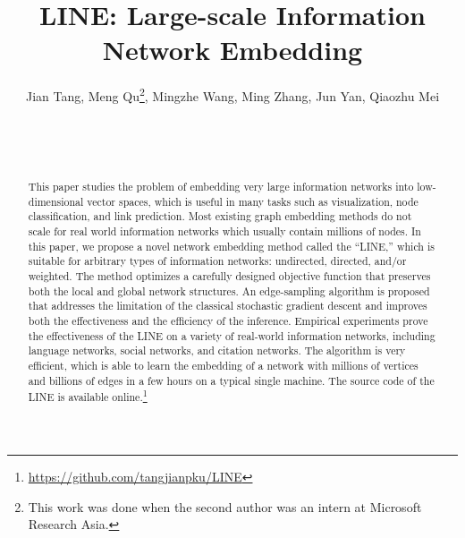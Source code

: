 \documentclass{sig-alternate-2013}
\begin{document}
\title{LINE: Large-scale Information Network Embedding}




\author{
Jian Tang, Meng Qu\thanks{This work was done when the second author was an intern at Microsoft Research Asia.}, Mingzhe Wang, Ming Zhang, Jun Yan, Qiaozhu Mei \\
\\
\\
\\
}


\maketitle
\begin{abstract}












This paper studies the problem of embedding very large information networks into low-dimensional vector spaces, which is useful in many tasks such as visualization, node classification, and link prediction. Most existing graph embedding methods do not scale for real world information networks which usually contain millions of nodes. In this paper, we propose a novel network embedding method called the ``LINE,'' which is suitable for arbitrary types of information networks: undirected, directed, and/or weighted. The method optimizes a carefully designed objective function that preserves both the local and global network structures. An edge-sampling algorithm is proposed that addresses the limitation of the classical stochastic gradient descent and improves both the effectiveness and the efficiency of the inference. Empirical experiments prove the effectiveness of the LINE on a variety of real-world information networks, including language networks, social networks, and citation networks. The algorithm is very efficient, which is able to learn the embedding of a network with millions of vertices and billions of edges in a few hours on a typical single machine. The source code of the LINE is available online.\footnote{\url{https://github.com/tangjianpku/LINE}}















\end{abstract}
\end{document}
